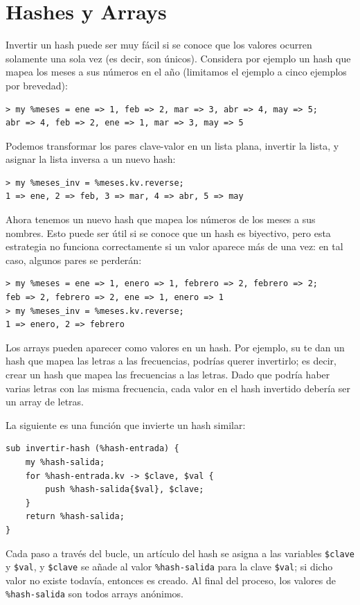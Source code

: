 \section{Hashes y Arrays}
\label{invert}

Invertir un hash puede ser muy fácil si se conoce que los valores 
ocurren solamente una sola vez (es decir, son únicos). Considera por ejemplo
un hash que mapea los meses a sus números en el año
(limitamos el ejemplo a cinco ejemplos por brevedad):

\begin{verbatim}
> my %meses = ene => 1, feb => 2, mar => 3, abr => 4, may => 5;
abr => 4, feb => 2, ene => 1, mar => 3, may => 5
\end{verbatim}
%

Podemos transformar los pares clave-valor en un lista plana,
invertir la lista, y asignar la lista inversa a un nuevo hash:

\begin{verbatim}
> my %meses_inv = %meses.kv.reverse;
1 => ene, 2 => feb, 3 => mar, 4 => abr, 5 => may
\end{verbatim}
%

Ahora tenemos un nuevo hash que mapea los números de los meses
a sus nombres. Esto puede ser útil si se conoce que un hash es biyectivo,
pero esta estrategia no funciona correctamente si un valor aparece más de una
vez: en tal caso, algunos pares se perderán:

\begin{verbatim}
> my %meses = ene => 1, enero => 1, febrero => 2, febrero => 2;
feb => 2, febrero => 2, ene => 1, enero => 1
> my %meses_inv = %meses.kv.reverse;
1 => enero, 2 => febrero
\end{verbatim}

Los arrays pueden aparecer como valores en un hash. Por ejemplo,
su te dan un hash que mapea las letras a las frecuencias, podrías querer
invertirlo; es decir, crear un hash que mapea las frecuencias  a las
letras. Dado que podría haber varias letras con las misma frecuencia, cada
valor en el hash invertido debería ser un array de letras.

La siguiente es una función que invierte un hash similar:

\begin{verbatim}
sub invertir-hash (%hash-entrada) { 
    my %hash-salida; 
    for %hash-entrada.kv -> $clave, $val {
        push %hash-salida{$val}, $clave; 
    }
    return %hash-salida;
}
\end{verbatim}
%
Cada paso a través del bucle, un artículo del hash se asigna a las variables
\verb|$clave| y  \verb|$val|, y \verb|$clave| se añade al valor \verb|%hash-salida|
para la clave \verb|$val|; si dicho valor no existe todavía, entonces es creado.
Al final del proceso, los valores de \verb|%hash-salida| son todos arrays anónimos.

